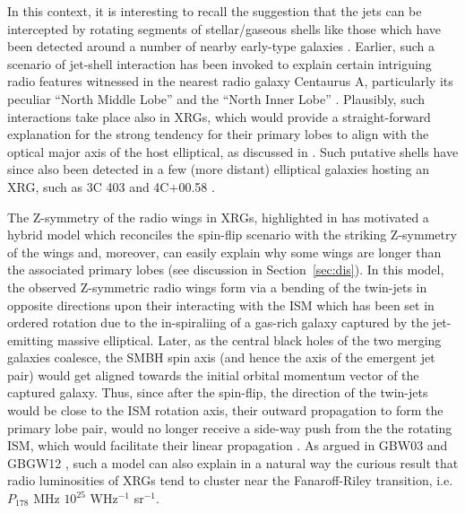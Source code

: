 \documentclass[twocolumn]{aastex62}
\begin{document}
In this context, it is interesting to recall the suggestion that the
jets can be intercepted by rotating segments of stellar/gaseous
shells like  those which have been detected around a number of nearby
early-type galaxies
\citep{Carter1982Natur.295..126C,Schiminovich1994ApJ...423L.101S,
  Oosterloo2005A&A...429..469O,
  Sikkema2007A&A...467.1011S,Struve2010A&A...513A..10S,Mancillas2019arXiv190511356M}.
Earlier, such a scenario of jet-shell interaction has been invoked to
explain certain intriguing radio features witnessed in the nearest
radio galaxy Centaurus A, particularly its peculiar ``North Middle
Lobe'' \citep[] [hereafter GKW10]{Gopal2010ApJ...720L.155G} and the
``North Inner Lobe''
\citep{Gopal1984A&A...141...61G,Gopal1983Natur.303..217G}. Plausibly,
such interactions take place also in XRGs, which would provide a
straight-forward explanation for the strong tendency for their primary
lobes to align with the optical major axis of the host elliptical, as
discussed in
\citet[][, hereafter GBW03, GBGW12]{Gopal2003ApJ...594L.103G,Gopal2012RAA....12..127G}. Such
putative shells have since also been detected in a few (more distant)
elliptical galaxies hosting an XRG, such as 3C 403 and 4C$+$00.58
\citep{Hodges2010ApJ...717L..37H,
  Ramos2011MNRAS.410.1550R,Tadhunter2016A&ARv..24...10T}.


The Z-symmetry of the radio wings in XRGs, highlighted in \citet{Gopal2003ApJ...594L.103G} 
has motivated a hybrid model which reconciles the spin-flip scenario with 
the striking Z-symmetry of the wings and, moreover, can easily explain why 
some wings are longer than the associated primary lobes (see discussion in 
Section~\ref{sec:dis}). In this model, the observed Z-symmetric radio wings 
form via a bending of the twin-jets in opposite directions upon their 
interacting with the ISM which has been set in ordered rotation due to the 
in-spiraliing of a gas-rich galaxy captured by the jet-emitting massive 
elliptical. Later, as the central black holes of the two merging galaxies 
coalesce, the SMBH spin axis (and hence the axis of the emergent jet pair) 
would get aligned towards the initial orbital momentum vector of the captured 
galaxy. Thus, since after the spin-flip, the direction of the twin-jets would 
be close to the ISM rotation axis, their outward propagation to form the primary 
lobe pair, would no longer receive a side-way push from the the rotating ISM,
which would facilitate their linear propagation \citep{Gopal2003ApJ...594L.103G}. 
As argued in GBW03 and GBGW12 \citep[see, also,][]{Hodges2014ApJ...789..131H}, 
such a model can also explain in a natural way the curious result that radio 
luminosities of XRGs tend to cluster near the Fanaroff-Riley transition, i.e. 
$P_{178}$ MHz $10^{25}$ WHz$^{-1}$ sr$^{-1}$.
\end{document}
